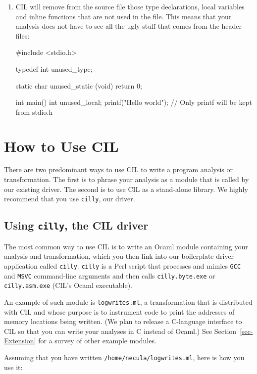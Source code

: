 \documentclass{article}
\def\secref#1{Section~\ref{sec-#1}}
\def\t#1{{\tt #1}}
\begin{document}
\begin{enumerate}
\item CIL will remove from the source file those type declarations, local
variables and inline functions that are not used in the file. This means that
your analysis does not have to see all the ugly stuff that comes from the
header files: 
\begin{cilcode}[global]
#include <stdio.h>

typedef int unused_type;

static char unused_static (void) { return 0; }

int main() {
  int unused_local;
  printf("Hello world\n"); // Only printf will be kept from stdio.h     
}
\end{cilcode}

\end{enumerate}

\section{How to Use CIL}\label{sec-cil}

There are two predominant ways to use CIL to write a program analysis or
transformation. The first is to phrase your analysis as a module that is
called by our existing driver. The second is to use CIL as a stand-alone
library. We highly recommend that you use \t{cilly}, our driver. 

\subsection{Using \t{cilly}, the CIL driver}

The most common way to use CIL is to write an Ocaml module containing your
analysis and transformation, which you then link into our boilerplate
driver application called \t{cilly}. \t{cilly} is a Perl script that
processes and mimics \t{GCC} and \t{MSVC} command-line arguments and then
calls \t{cilly.byte.exe} or \t{cilly.asm.exe} (CIL's Ocaml executable). 

An example of such module is \t{logwrites.ml}, a transformation that is
distributed with CIL and whose purpose is to instrument code to print the
addresses of memory locations being written. (We plan to release a
C-language interface to CIL so that you can write your analyses in C
instead of Ocaml.) See \secref{Extension} for a survey of other example
modules. 

Assuming that you have written \t{/home/necula/logwrites.ml}, 
here is how you use it: 
\end{document}
